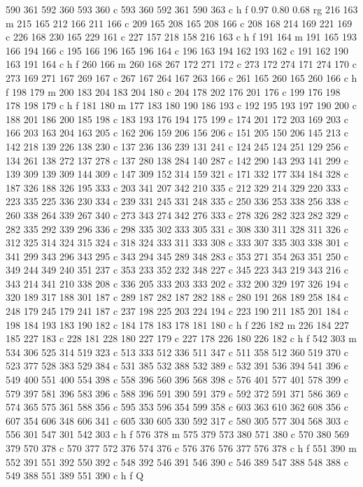 {{   590 361 592 360 593 360 c
   593 360 592 361 590 363 c
   h f
   0.97 0.80 0.68 rg
   216 163 m
   215 165 212 166 211 166 c
   209 165 208 165 208 166 c
   208 168 214 169 221 169 c
   226 168 230 165 229 161 c
   227 157 218 158 216 163 c
   h f
   191 164 m
   191 165 193 166 194 166 c
   195 166 196 165 196 164 c
   196 163 194 162 193 162 c
   191 162 190 163 191 164 c
   h f
   260 166 m
   260 168 267 172 271 172 c
   273 172 274 171 274 170 c
   273 169 271 167 269 167 c
   267 167 264 167 263 166 c
   261 165 260 165 260 166 c
   h f
   198 179 m
   200 183 204 183 204 180 c
   204 178 202 176 201 176 c
   199 176 198 178 198 179 c
   h f
   181 180 m
   177 183 180 190 186 193 c
   192 195 193 197 190 200 c
   188 201 186 200 185 198 c
   183 193 176 194 175 199 c
   174 201 172 203 169 203 c
   166 203 163 204 163 205 c
   162 206 159 206 156 206 c
   151 205 150 206 145 213 c
   142 218 139 226 138 230 c
   137 236 136 239 131 241 c
   124 245 124 251 129 256 c
   134 261 138 272 137 278 c
   137 280 138 284 140 287 c
   142 290 143 293 141 299 c
   139 309 139 309 144 309 c
   147 309 152 314 159 321 c
   171 332 177 334 184 328 c
   187 326 188 326 195 333 c
   203 341 207 342 210 335 c
   212 329 214 329 220 333 c
   223 335 225 336 230 334 c
   239 331 245 331 248 335 c
   250 336 253 338 256 338 c
   260 338 264 339 267 340 c
   273 343 274 342 276 333 c
   278 326 282 323 282 329 c
   282 335 292 339 296 336 c
   298 335 302 333 305 331 c
   308 330 311 328 311 326 c
   312 325 314 324 315 324 c
   318 324 333 311 333 308 c
   333 307 335 303 338 301 c
   341 299 343 296 343 295 c
   343 294 345 289 348 283 c
   353 271 354 263 351 250 c
   349 244 349 240 351 237 c
   353 233 352 232 348 227 c
   345 223 343 219 343 216 c
   343 214 341 210 338 208 c
   336 205 333 203 333 202 c
   332 200 329 197 326 194 c
   320 189 317 188 301 187 c
   289 187 282 187 282 188 c
   280 191 268 189 258 184 c
   248 179 245 179 241 187 c
   237 198 225 203 224 194 c
   223 190 211 185 201 184 c
   198 184 193 183 190 182 c
   184 178 183 178 181 180 c
   h f
   226 182 m
   226 184 227 185 227 183 c
   228 181 228 180 227 179 c
   227 178 226 180 226 182 c
   h f
   542 303 m
   534 306 525 314 519 323 c
   513 333 512 336 511 347 c
   511 358 512 360 519 370 c
   523 377 528 383 529 384 c
   531 385 532 388 532 389 c
   532 391 536 394 541 396 c
   549 400 551 400 554 398 c
   558 396 560 396 568 398 c
   576 401 577 401 578 399 c
   579 397 581 396 583 396 c
   588 396 591 390 591 379 c
   592 372 591 371 586 369 c
   574 365 575 361 588 356 c
   595 353 596 354 599 358 c
   603 363 610 362 608 356 c
   607 354 606 348 606 341 c
   605 330 605 330 592 317 c
   580 305 577 304 568 303 c
   556 301 547 301 542 303 c
   h f
   576 378 m
   575 379 573 380 571 380 c
   570 380 569 379 570 378 c
   570 377 572 376 574 376 c
   576 376 576 377 576 378 c
   h f
   551 390 m
   552 391 551 392 550 392 c
   548 392 546 391 546 390 c
   546 389 547 388 548 388 c
   549 388 551 389 551 390 c
   h f
   Q
}}


